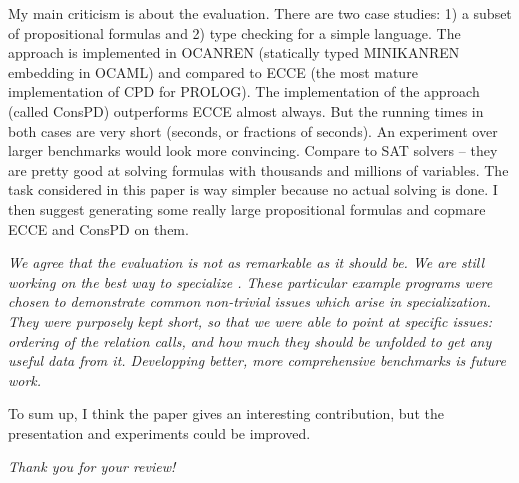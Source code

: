 My main criticism is about the evaluation. There are two case studies: 1) a subset of propositional formulas and 2) type checking for a simple language. The approach is implemented in OCANREN (statically typed MINIKANREN embedding in OCAML) and compared to ECCE (the most mature implementation of CPD for PROLOG). The implementation of the approach (called ConsPD) outperforms ECCE almost always. But the running times in both cases are very short (seconds, or fractions of seconds). An experiment over larger benchmarks would look more convincing. Compare to SAT solvers -- they are pretty good at solving formulas with thousands and millions of variables. The task considered in this paper is way simpler because no actual solving is done. I then suggest generating some really large propositional formulas and copmare ECCE and ConsPD on them.

\emph{We agree that the evaluation is not as remarkable as it should be. We are still working on the best way to specialize \mk. These particular example programs were chosen to demonstrate common non-trivial issues which arise in \mk specialization. They were purposely kept short, so that we were able to point at specific issues: ordering of the relation calls, and how much they should be unfolded to get any useful data from it. Developping better, more comprehensive benchmarks is future work.}

To sum up, I think the paper gives an interesting contribution, but the presentation and experiments could be improved.

\emph{Thank you for your review!}
